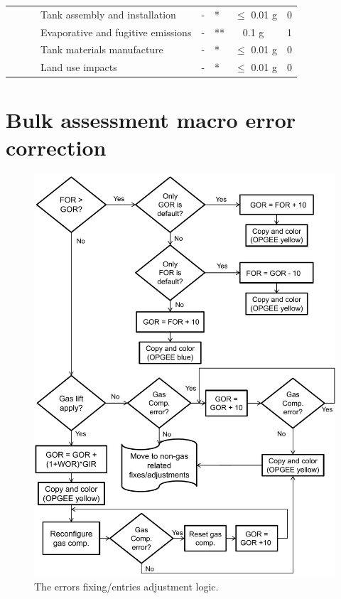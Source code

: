 \documentclass[11pt]{report}
\begin{document}
\begin{landscape}
\begin{table}
\begin{scriptsize}
\begin{tabular}{|p{}|p{}|p{}|p{}|p{}|p{}|p{}|p{}|}
\cline{4-8}
& & & Tank assembly and installation & - & * & $\leq$ 0.01 g & 0\\
\cline{4-8}
& & & Evaporative and fugitive emissions & - & ** & ~ 0.1 g & 1\\
\cline{4-8}
& & & Tank materials manufacture & - & * & $\leq$ 0.01 g & 0\\
\cline{4-8}
& & & Land use impacts & - & * & $\leq$ 0.01 g & 0\\
\hline
\end{tabular}
\end{scriptsize}
\end{table}
\end{landscape}




\chapter{Bulk assessment macro error correction}\label{sec:macro_error}


\begin{figure}[t]
\includegraphics[width=0.8\columnwidth]{images/macro_logic_2a.pdf}
\caption{The errors fixing/entries adjustment logic.}
\label{fig:macro_logic_2}
\end{figure}
\end{document}
